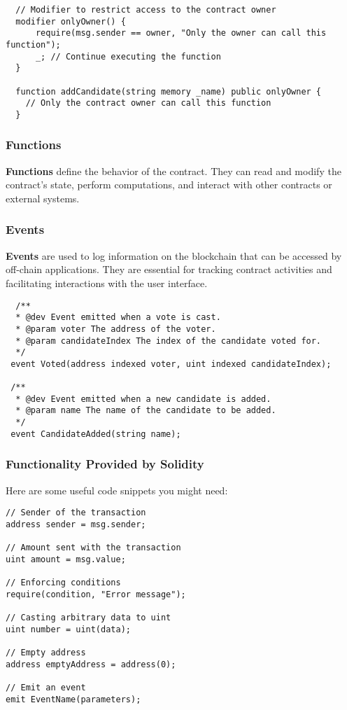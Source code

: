 \documentclass[12pt]{article}
\begin{document}
\begin{verbatim}
  // Modifier to restrict access to the contract owner
  modifier onlyOwner() {
      require(msg.sender == owner, "Only the owner can call this function");
      _; // Continue executing the function
  }

  function addCandidate(string memory _name) public onlyOwner {
    // Only the contract owner can call this function
  }
\end{verbatim}

\subsubsection{Functions}

\textbf{Functions} define the behavior of the contract. They can read and modify the contract's state, perform computations, and interact with other contracts or external systems.

\subsubsection{Events}

\textbf{Events} are used to log information on the blockchain that can be accessed by off-chain applications. They are essential for tracking contract activities and facilitating interactions with the user interface.

\begin{verbatim}
  /**
  * @dev Event emitted when a vote is cast.
  * @param voter The address of the voter.
  * @param candidateIndex The index of the candidate voted for.
  */
 event Voted(address indexed voter, uint indexed candidateIndex);

 /**
  * @dev Event emitted when a new candidate is added.
  * @param name The name of the candidate to be added.
  */
 event CandidateAdded(string name);
\end{verbatim}

\subsubsection{Functionality Provided by Solidity}
Here are some useful code snippets you might need:

\begin{verbatim}
// Sender of the transaction
address sender = msg.sender;

// Amount sent with the transaction
uint amount = msg.value;

// Enforcing conditions
require(condition, "Error message");

// Casting arbitrary data to uint
uint number = uint(data);

// Empty address
address emptyAddress = address(0);

// Emit an event
emit EventName(parameters);
\end{verbatim}
\end{document}

